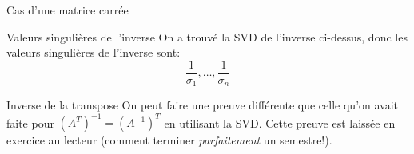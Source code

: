 \documentclass[a4paper]{article}
\begin{document}
\begin{parag}{Cas d'une matrice carrée}
    \begin{subparag}{Valeurs singulières de l'inverse}
        On a trouvé la SVD de l'inverse ci-dessus, donc les valeurs singulières de l'inverse sont: 
        \[\frac{1}{\sigma_1}, \ldots, \frac{1}{\sigma_n}\]
    \end{subparag}
    
    \begin{subparag}{Inverse de la transpose}
        On peut faire une preuve différente que celle qu'on avait faite pour $\left(A^T\right)^{-1} = \left(A^{-1}\right)^T$ en utilisant la SVD. Cette preuve est laissée en exercice au lecteur (comment terminer \textit{parfaitement} un semestre!). 
    \end{subparag}
\end{parag}
\end{document}
